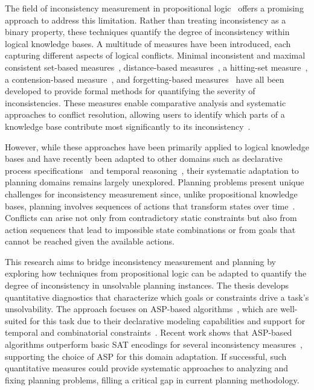 \documentclass[proposal,english,palatino]{AIGpaper}
\begin{document}
The field of inconsistency measurement in propositional logic~\cite{Thimm2019} offers a promising approach to address this limitation. Rather than treating inconsistency as a binary property, these techniques quantify the degree of inconsistency within logical knowledge bases. A multitude of measures have been introduced, each capturing different aspects of logical conflicts. Minimal inconsistent and maximal consistent set-based measures~\cite{Hunter2008}, distance-based measures~\cite{Grant2013,Grant2017}, a hitting-set measure~\cite{Thimm2018}, a contension-based measure~\cite{Grant2011,Thimm2018}, and forgetting-based measures~\cite{Besnard2016} have all been developed to provide formal methods for quantifying the severity of inconsistencies. These measures enable comparative analysis and systematic approaches to conflict resolution, allowing users to identify which parts of a knowledge base contribute most significantly to its inconsistency~\cite{Thimm2019}.

However, while these approaches have been primarily applied to logical knowledge bases and have recently been adapted to other domains such as declarative process specifications~\cite{Corea2022} and temporal reasoning~\cite{Condotta2024}, their systematic adaptation to planning domains remains largely unexplored. Planning problems present unique challenges for inconsistency measurement since, unlike propositional knowledge bases, planning involves sequences of actions that transform states over time~\cite{Russell2016}. Conflicts can arise not only from contradictory static constraints but also from action sequences that lead to impossible state combinations or from goals that cannot be reached given the available actions.

This research aims to bridge inconsistency measurement and planning by exploring how techniques from propositional logic can be adapted to quantify the degree of inconsistency in unsolvable planning instances. The thesis develops quantitative diagnostics that characterize which goals or constraints drive a task's unsolvability. The approach focuses on \ac{ASP}-based algorithms~\cite{Ulbricht2016}, which are well-suited for this task due to their declarative modeling capabilities and support for temporal and combinatorial constraints~\cite{Dimopoulos1997,Dimopoulos2019}. Recent work shows that \ac{ASP}-based algorithms outperform basic \ac{SAT} encodings for several inconsistency measures~\cite{Kuhlmann2025}, supporting the choice of \ac{ASP} for this domain adaptation. If successful, such quantitative measures could provide systematic approaches to analyzing and fixing planning problems, filling a critical gap in current planning methodology.
\end{document}
